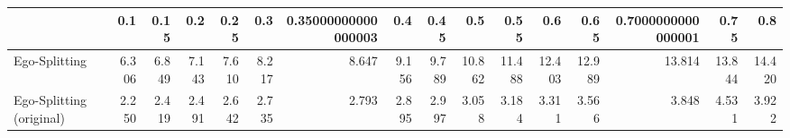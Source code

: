\begin{tabular}{lrrrrrrrrrrrrrrr}
\toprule
{} &   0.1 &  0.15 &   0.2 &  0.25 &   0.3 & 0.35000000000000003 &   0.4 &  0.45 &    0.5 &   0.55 &    0.6 &   0.65 & 0.7000000000000001 &   0.75 &    0.8 \\
\midrule
Ego-Splitting            & 6.306 & 6.849 & 7.143 & 7.610 & 8.217 &               8.647 & 9.156 & 9.789 & 10.862 & 11.488 & 12.403 & 12.989 &             13.814 & 13.844 & 14.420 \\
Ego-Splitting (original) & 2.250 & 2.419 & 2.491 & 2.642 & 2.735 &               2.793 & 2.895 & 2.997 &  3.058 &  3.184 &  3.311 &  3.566 &              3.848 &  4.531 &  3.922 \\
\bottomrule
\end{tabular}
